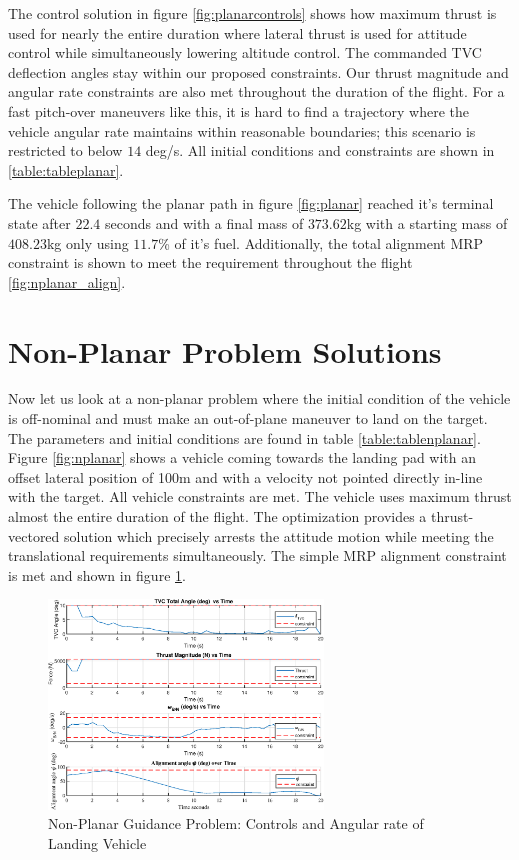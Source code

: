\documentclass[conf]{new-aiaa}
\begin{document}
The control solution in figure \ref{fig:planarcontrols} shows how maximum thrust is used for nearly the entire duration where lateral thrust is used for attitude control while simultaneously lowering altitude control. The commanded TVC deflection angles stay within our proposed constraints. Our thrust magnitude and angular rate constraints are also met throughout the duration of the flight. For a fast pitch-over maneuvers like this, it is hard to find a trajectory where the vehicle angular rate maintains within reasonable boundaries; this scenario is restricted to below $14$ deg/s. All initial conditions and constraints are shown in \ref{table:tableplanar}.


The vehicle following the planar path in figure \ref{fig:planar} reached it's terminal state after $22.4$ seconds and with a final mass of $373.62$kg with a starting mass of $408.23$kg only using $11.7$\% of it's fuel. Additionally, the total alignment MRP constraint is shown to meet the requirement throughout the flight \ref{fig:nplanar_align}.


\section{Non-Planar Problem Solutions}
Now let us look at a non-planar problem where the initial condition of the vehicle is off-nominal and must make an out-of-plane maneuver to land on the target. The parameters and initial conditions are found in table \ref{table:tablenplanar}. Figure \ref{fig:nplanar} shows a vehicle coming towards the landing pad with an offset lateral position of 100m and with a velocity not pointed directly in-line with the target. All vehicle constraints are met. The vehicle uses maximum thrust almost the entire duration of the flight. The optimization provides a thrust-vectored solution which precisely arrests the attitude motion while meeting the translational requirements simultaneously. The simple MRP alignment constraint is met and shown in figure \ref{fig:nplanarcontrols}.

\begin{figure}[!htbp] 
  \centering
  \includegraphics[width=0.65\textwidth]{figs/nonplanar_controls.eps}
  \caption{Non-Planar Guidance Problem: Controls and Angular rate of Landing Vehicle}
  \label{fig:nplanarcontrols}
 \end{figure}
\end{document}
